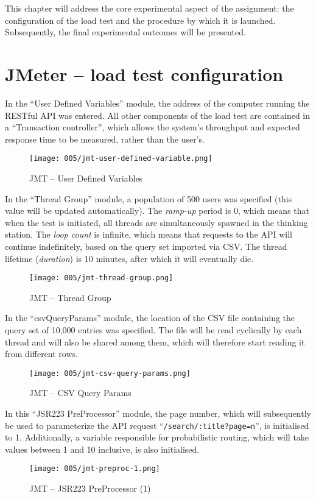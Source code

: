 This chapter will address the core experimental aspect of the assignment: the configuration of the load test and the procedure by which it is launched.
Subsequently, the final experimental outcomes will be presented.

\section{JMeter – load test configuration}

In the ``User Defined Variables'' module, the address of the computer running the RESTful API was entered.
All other components of the load test are contained in a ``Transaction controller'', which allows the system's throughput and expected response time to be measured, rather than the user's.
\begin{figure}[h]
	\centering
	\texttt{[image: 005/jmt-user-defined-variable.png]}
	\caption{JMT -- User Defined Variables}
\end{figure}

\clearpage

In the ``Thread Group'' module, a population of 500 users was specified (this value will be updated automatically).
The \textit{ramp-up} period is 0, which means that when the test is initiated, all threads are simultaneously spawned in the thinking station.
The \textit{loop count} is infinite, which means that requests to the API will continue indefinitely, based on the query set imported via CSV.
The thread lifetime (\textit{duration}) is 10 minutes, after which it will eventually die.
\begin{figure}[h]
	\centering
	\texttt{[image: 005/jmt-thread-group.png]}
	\caption{JMT -- Thread Group}
\end{figure}

In the ``csvQueryParams'' module, the location of the CSV file containing the query set of 10,000 entries was specified.
The file will be read cyclically by each thread and will also be shared among them, which will therefore start reading it from different rows.
\begin{figure}[h]
	\centering
	\texttt{[image: 005/jmt-csv-query-params.png]}
	\caption{JMT -- CSV Query Params}
\end{figure}

\clearpage

In this ``JSR223 PreProcessor'' module, the page number, which will subsequently be used to parameterize the API request ``\verb|/search/:title?page=n|'', is initialised to 1.
Additionally, a variable responsible for probabilistic routing, which will take values between 1 and 10 inclusive, is also initialised.
\begin{figure}[h]
	\centering
	\texttt{[image: 005/jmt-preproc-1.png]}
	\caption{JMT -- JSR223 PreProcessor (1)}
\end{figure}

